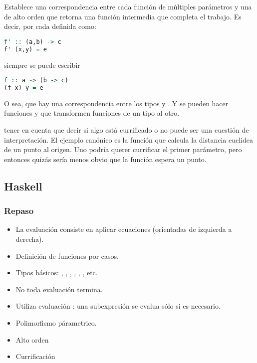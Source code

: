 Establece una correspondencia entre cada función de múltiples parámetros y una de alto orden que retorna una función intermedia que completa el trabajo. Es decir, por cada  definida como:
\begin{lstlisting}[language=Haskell]
f' :: (a,b) -> c
f' (x,y) = e
\end{lstlisting}

siempre se puede escribir

\begin{lstlisting}[language=Haskell]
f :: a -> (b -> c)
(f x) y = e
\end{lstlisting}

O sea, que hay una correspondencia entre los tipos  y . Y se pueden hacer funciones  y  que transformen funciones de un tipo al otro.

 tener en cuenta que decir si algo está currificado o no puede ser una cuestión de interpretación. El ejemplo canónico es la función  que calcula la distancia euclidea de un punto al origen. Uno podría querer currificar el primer parámetro, pero entonces quizás sería menos obvio que la función espera un punto.

\subsection{Haskell}

\subsubsection{Repaso}

\begin{itemize}
  \item La evaluación consiste en aplicar ecuaciones (orientadas de izquierda a derecha).
  \item Definición de funciones por casos.
  \item Tipos básicos: , , , , , , etc.
  \item No toda evaluación termina.
  \item Utiliza evaluación : una subexpresión se evalua sólo si es necesario.
  \item Polimorfismo párametrico.
  \item Alto orden
  \item Currificación
\end{itemize}

